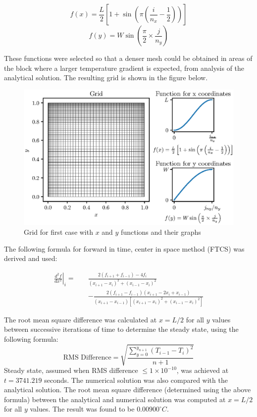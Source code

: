 \documentclass[12pt,a4paper,fleqn]{article}
\begin{document}
\begin{equation}
f(x)=\frac{L}{2}\left[ 1 + \sin\left(\pi\left(\frac{i}{n_x} -
\frac{1}{2}\right)\right)\right]
\end{equation}
\begin{equation}
f(y)=W\sin\left(\frac{\pi}{2}\times\frac{j}{n_y}\right)
\end{equation}

These functions were selected so that a denser mesh could be obtained in areas
of the block where a larger temperature gradient is expected, from analysis of
the analytical solution. The resulting grid is shown in the figure below.

\begin{figure}[hp!]
\centering
\includegraphics[width=\linewidth]{gridCase01.eps}
\caption{Grid for first case with $x$ and $y$ functions and their graphs}
\end{figure}

The following formula for forward in time, center in space method (FTCS) was
derived and used:

\begin{equation}
\begin{split}
\left.\frac{d^2f}{dx^2}\right|_i = \quad &\frac{2(f_{i+1} + f_{i-1}) -
4f_i}{(x_{i+1} - x_i)^2 + (x_{i-1} - x_i)^2}
\\& - \frac{2(f_{i+1} - f_{i-1})(x_{i+1} - 2x_i + x_{i-1})}{(x_{i+1} -
x_{i-1})[(x_{i+1} - x_i)^2 + (x_{i-1} - x_i)^2]}
\end{split}
\end{equation}

The root mean square difference was calculated at $x = L/2$ for all $y$ values
between successive iterations of time to determine the steady state, using the
following formula:
\begin{equation}
\text{RMS Difference} =
\sqrt{\frac{\sum\limits_{y=0}^{y_{n+1}}(T_{i-1}-T_i)^2}{n+1}}
\end{equation}
Steady state, assumed when RMS difference $\leq1\times10^{-10}$, was achieved at
$t=3741.219$ seconds.
The numerical solution was also compared with the analytical solution. The root
mean square difference (determined using the above formula) between the 
analytical and numerical solution was computed at $x = L/2$ for all $y$ values.
The result was found to be $0.00900^{\circ}C$.
\end{document}
